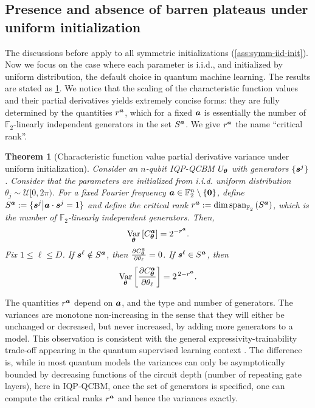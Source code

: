 \documentclass[10pt, twocolumn, a4paper]{article}
\theoremstyle{plain}
\newtheorem{theorem}{Theorem}[section]
\theoremstyle{definition}
\theoremstyle{remark}
\begin{document}
\subsection{Presence and absence of barren plateaus under uniform initialization} \label{subsec:uniform}
The discussions before apply to all symmetric initializations (\cref{ass:symm-iid-init}). Now we focus on the case where each parameter is i.i.d., and initialized by uniform distribution, the default choice in quantum machine learning. The results are stated as \cref{thm:uniform}. We notice that the scaling of the characteristic function values and their partial derivatives yields extremely concise forms: they are fully determined by the quantities $r^{\bm{a}}$, which for a fixed ${\bm{a}}$ is essentially the number of $\mathbb{F}_2$-linearly independent generators in the set $S^{\bm{a}}$. We give $r^{\bm{a}}$ the name ``critical rank''.

\begin{theorem}[Characteristic function value partial derivative variance under uniform initialization]
\label{thm:uniform}
Consider an $n$-qubit IQP-QCBM $U_{\bm{\theta}}$ with generators $\{{\bm{s}^j}\}$. Consider that the parameters are initialized from i.i.d. uniform distribution $\theta_j \sim\mathcal{U}[0,2\pi)$. For a fixed Fourier frequency ${\bm{a}} \in \mathbb{F}_2^n \setminus \{\mathbf{0}\}$, define $S^{{\bm{a}}} := \{ {\bm{s}^j} \big| {\bm{a}} \cdot {\bm{s}^j} = 1 \}$ and define the critical rank $r^{\bm{a}} := \dim \operatorname{span}_{\mathbb{F}_2}\left( S^{{\bm{a}}} \right)$, which is the number of $\mathbb{F}_2$-linearly independent generators. Then, \begin{equation}
\operatorname*{Var}_{{\bm{\theta}}} \left[ C^{\bm{a}}_{\bm{\theta}}\right] = 2^{-r^{\bm{a}}}. 
\end{equation} Fix $1\leq \ell \leq D$. If ${\bm{s}^\ell} \notin S^{\bm{a}}$, then $ \frac{\partial C^{\bm{a}}_{\bm{\theta}}}{\partial \theta_\ell}=0$. If ${\bm{s}^\ell} \in S^{\bm{a}}$, then
\begin{equation}
\operatorname*{Var}_{{\bm{\theta}}} \left[ \frac{\partial C^{\bm{a}}_{\bm{\theta}}}{\partial \theta_\ell} \right] = 2^{\,2-r^{\bm{a}}}. \end{equation}
\end{theorem}

The quantities $r^{\bm{a}}$ depend on ${\bm{a}}$, and the type and number of generators. The variances are monotone non-increasing in the sense that they will either be unchanged or decreased, but never increased, by adding more generators to a model. This observation is consistent with the general expressivity-trainability trade-off appearing in the quantum supervised learning context \cite{mcclean18, Holmes22}. The difference is, while in most quantum models the variances can only be asymptotically bounded by decreasing functions of the circuit depth (number of repeating gate layers), here in IQP-QCBM, once the set of generators is specified, one can compute the critical ranks $r^{\bm{a}}$ and hence the variances exactly.  
\end{document}
